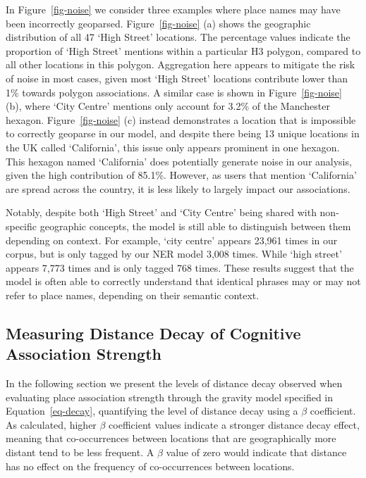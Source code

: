 \documentclass[
  letterpaper,
  11pt,
  english,
  onehalfspacing,
  headsepline]{MastersDoctoralThesis}
\begin{document}
In Figure~\ref{fig-noise} we consider three examples where place names
may have been incorrectly geoparsed. Figure~\ref{fig-noise} (a) shows
the geographic distribution of all 47 `High Street' locations. The
percentage values indicate the proportion of `High Street' mentions
within a particular H3 polygon, compared to all other locations in this
polygon. Aggregation here appears to mitigate the risk of noise in most
cases, given most `High Street' locations contribute lower than 1\%
towards polygon associations. A similar case is shown in
Figure~\ref{fig-noise} (b), where `City Centre' mentions only account
for 3.2\% of the Manchester hexagon. Figure~\ref{fig-noise} (c) instead
demonstrates a location that is impossible to correctly geoparse in our
model, and despite there being 13 unique locations in the UK called
`California', this issue only appears prominent in one hexagon. This
hexagon named `California' does potentially generate noise in our
analysis, given the high contribution of 85.1\%. However, as users that
mention `California' are spread across the country, it is less likely to
largely impact our associations.

Notably, despite both `High Street' and `City Centre' being shared with
non-specific geographic concepts, the model is still able to distinguish
between them depending on context. For example, `city centre' appears
23,961 times in our corpus, but is only tagged by our NER model 3,008
times. While `high street' appears 7,773 times and is only tagged 768
times. These results suggest that the model is often able to correctly
understand that identical phrases may or may not refer to place names,
depending on their semantic context.

\hypertarget{measuring-distance-decay-of-cognitive-association-strength}{%
\subsection{Measuring Distance Decay of Cognitive Association
Strength}\label{measuring-distance-decay-of-cognitive-association-strength}}

In the following section we present the levels of distance decay
observed when evaluating place association strength through the gravity
model specified in Equation~\ref{eq-decay}, quantifying the level of
distance decay using a \(\beta\) coefficient. As calculated, higher
\(\beta\) coefficient values indicate a stronger distance decay effect,
meaning that co-occurrences between locations that are geographically
more distant tend to be less frequent. A \(\beta\) value of zero would
indicate that distance has no effect on the frequency of co-occurrences
between locations.
\end{document}
